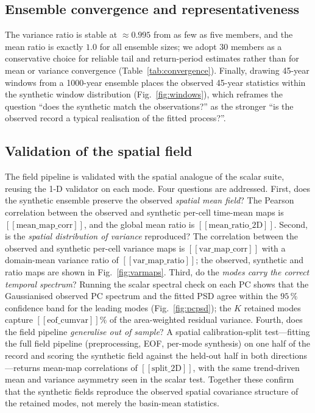 \subsection{Ensemble convergence and representativeness}

The variance ratio is stable at $\approx0.995$ from as few as five members,
and the mean ratio is exactly $1.0$ for all ensemble sizes; we adopt $30$
members as a conservative choice for reliable tail and return-period
estimates rather than for mean or variance convergence
(Table~\ref{tab:convergence}). Finally, drawing 45-year windows from a
1000-year ensemble places the observed 45-year statistics within the
synthetic window distribution (Fig.~\ref{fig:windows}), which reframes the
question ``does the synthetic match the observations?'' as the stronger
``is the observed record a typical realisation of the fitted process?''.

\subsection{Validation of the spatial field}\label{sec:spatialval}

The field pipeline is validated with the spatial analogue of the scalar
suite, reusing the 1-D validator on each mode. Four questions are addressed.
First, does the synthetic ensemble preserve the observed \emph{spatial mean
field}? The Pearson correlation between the observed and synthetic per-cell
time-mean maps is $[[\text{mean\_map\_corr}]]$, and the global mean ratio is
$[[\text{mean\_ratio\_2D}]]$. Second, is the \emph{spatial distribution of
variance} reproduced? The correlation between the observed and synthetic
per-cell variance maps is $[[\text{var\_map\_corr}]]$ with a domain-mean
variance ratio of $[[\text{var\_map\_ratio}]]$; the observed, synthetic and
ratio maps are shown in Fig.~\ref{fig:varmaps}. Third, do the \emph{modes
carry the correct temporal spectrum}? Running the scalar spectral check on
each PC shows that the Gaussianised observed PC spectrum and the fitted PSD
agree within the $95\,\%$ confidence band for the leading modes
(Fig.~\ref{fig:pcpsd}); the $K$ retained modes capture
$[[\text{eof\_cumvar}]]\%$ of the area-weighted residual variance. Fourth,
does the field pipeline \emph{generalise out of sample}? A spatial
calibration-split test---fitting the full field pipeline (preprocessing, EOF,
per-mode synthesis) on one half of the record and scoring the synthetic field
against the held-out half in both directions---returns mean-map correlations
of $[[\text{split\_2D}]]$, with the same trend-driven mean and variance
asymmetry seen in the scalar test. Together these confirm that the synthetic
fields reproduce the observed spatial covariance structure of the retained
modes, not merely the basin-mean statistics.


